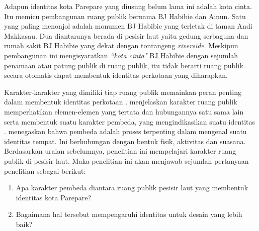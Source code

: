 \documentclass[12pt]{simart} %
\begin{document}
Adapun identitas kota Parepare yang diusung belum lama ini adalah kota cinta. Itu memicu pembangunan ruang publik bernama BJ Habibie dan Ainun. Satu yang paling menonjol adalah monumen BJ Habibie yang terletak di taman Andi Makkasau. Dua diantaranya berada di pesisir laut yaitu gedung serbaguna dan rumah sakit BJ Habibie yang dekat dengan tonrangeng \textit{riverside}.
Meskipun pembangunan ini mengisyaratkan \textit{``kota cinta"} BJ Habibie dengan sejumlah penamaan atau patung publik di ruang publik, itu tidak berarti ruang publik secara otomatis dapat membentuk identitas perkotaan yang diharapkan.

Karakter-karakter yang dimiliki tiap ruang publik memainkan peran penting dalam membentuk identitas perkotaan \citep{oktay2002}.
\cite{lynch1984} menjelaskan karakter ruang publik memperhatikan elemen-elemen yang tertata dan hubungannya satu sama lain serta membentuk suatu karakter pembeda,
yang mengindikasikan suatu identitas \citep{hartanti2014}. \cite{hartanti2014} menegaskan bahwa pembeda adalah proses terpenting dalam mengenal suatu identitas tempat. Ini berhubungan dengan  bentuk fisik, aktivitas dan suasana. Berdasarkan uraian sebelumnya, penelitian ini mempelajari karakter ruang publik di pesisir laut. Maka penelitian ini akan menjawab sejumlah pertanyaan penelitian sebagai berikut:

\begin{enumerate}
\item Apa karakter pembeda diantara ruang publik pesisir laut yang membentuk identitas kota Parepare?
\item Bagaimana hal tersebut mempengaruhi identitas untuk desain yang lebih baik?
\end{enumerate}

\begin{comment}
Karakter-karakter tersebut sebaiknya menimbulkan suatu pembeda

Karakter-karakter tiap ruang publik harus memiliki elemen yang sama yang menggambarkan karakter.

Satu diantara

Mereka membangun patung atau monumen bj habibie, memberi nama setiap bangunan dengan bj habibie. akan tetapi karakteristik tidak hanya bermaksud pada penamaan atau bla bla, tetapi pengalaman, makna atau bla bla bla bahkan sense of place.
Meskipun ini bersifat simbolis,
kota seharusnya berisi karakteristik lokal sehingga kota memiliki suatu pembeda.

\end{comment}
\end{document}
